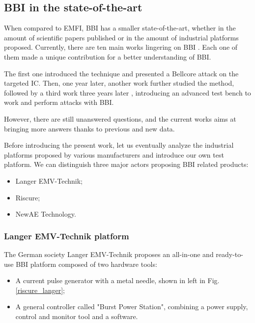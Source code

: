 \subsection{BBI in the state-of-the-art}
	When compared to EMFI, BBI has a smaller state-of-the-art, whether in the amount of scientific papers published or in the amount of industrial platforms proposed.
	Currently, there are ten main works lingering on BBI \cite{bbiOrigin, bbiSecond, bbiThird, bbiColin,japbbi, japbbi2, mybbiCosade, mybbiFdtc2022, mybbifdtc2023, colinFdtc2023}.
	Each one of them made a unique contribution for a better understanding of BBI.

	The first one \cite{bbiOrigin} introduced the technique and presented a Bellcore attack on the targeted IC.
	Then, one year later, another work \cite{bbiSecond} further studied the method, followed by a third work three years later \cite{bbiThird}, introducing an advanced test bench to work and perform attacks with BBI.

	However, there are still unanswered questions, and the current works aims at bringing more answers thanks to previous and new data.

	Before introducing the present work, let us eventually analyze the industrial platforms proposed by various manufacturers and introduce our own test platform.
	We can distinguish three major actors proposing BBI related products:
	\begin{itemize}
		\item Langer EMV-Technik;
		\item Riscure;
		\item NewAE Technology.
	\end{itemize}

	
	\subsubsection{Langer EMV-Technik platform}
		The German society Langer EMV-Technik proposes an all-in-one and ready-to-use BBI platform composed of two hardware tools:
		\begin{itemize}
			\item A current pulse generator with a metal needle, shown in left in Fig. \ref{riscure_langer};
			\item A general controller called "Burst Power Station", combining a power supply, control and monitor tool and a software.
		\end{itemize}
